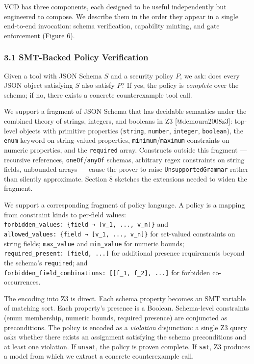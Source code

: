 VCD has three components, each designed to be useful independently but
engineered to compose. We describe them in the order they appear in a
single end-to-end invocation: schema verification, capability minting,
and gate enforcement (Figure 6).

\subsubsection{3.1 SMT-Backed Policy
Verification}\label{smt-backed-policy-verification}

Given a tool with JSON Schema \(S\) and a security policy \(P\), we ask:
does every JSON object satisfying \(S\) also satisfy \(P\)? If yes, the
policy is \emph{complete} over the schema; if no, there exists a
concrete counterexample tool call.

We support a fragment of JSON Schema that has decidable semantics under
the combined theory of strings, integers, and booleans in Z3
{[}@demoura2008z3{]}: top-level objects with primitive properties
(\texttt{string}, \texttt{number}, \texttt{integer}, \texttt{boolean}),
the \texttt{enum} keyword on string-valued properties,
\texttt{minimum}/\texttt{maximum} constraints on numeric properties, and
the \texttt{required} array. Constructs outside this fragment ---
recursive references, \texttt{oneOf}/\texttt{anyOf} schemas, arbitrary
regex constraints on string fields, unbounded arrays --- cause the
prover to raise \texttt{UnsupportedGrammar} rather than silently
approximate. Section 8 sketches the extensions needed to widen the
fragment.

We support a corresponding fragment of policy language. A policy is a
mapping from constraint kinds to per-field values:
\texttt{forbidden\_values:\ \{field\ →\ {[}v\_1,\ ...,\ v\_n{]}\}} and
\texttt{allowed\_values:\ \{field\ →\ {[}v\_1,\ ...,\ v\_n{]}\}} for
set-valued constraints on string fields; \texttt{max\_value} and
\texttt{min\_value} for numeric bounds;
\texttt{required\_present:\ {[}field,\ ...{]}} for additional presence
requirements beyond the schema's \texttt{required}; and
\texttt{forbidden\_field\_combinations:\ {[}{[}f\_1,\ f\_2{]},\ ...{]}}
for forbidden co-occurrences.

The encoding into Z3 is direct. Each schema property becomes an SMT
variable of matching sort. Each property's presence is a Boolean.
Schema-level constraints (enum membership, numeric bounds, required
presence) are conjuncted as preconditions. The policy is encoded as a
\emph{violation} disjunction: a single Z3 query asks whether there
exists an assignment satisfying the schema preconditions and at least
one violation. If \texttt{unsat}, the policy is proven complete. If
\texttt{sat}, Z3 produces a model from which we extract a concrete
counterexample call.

